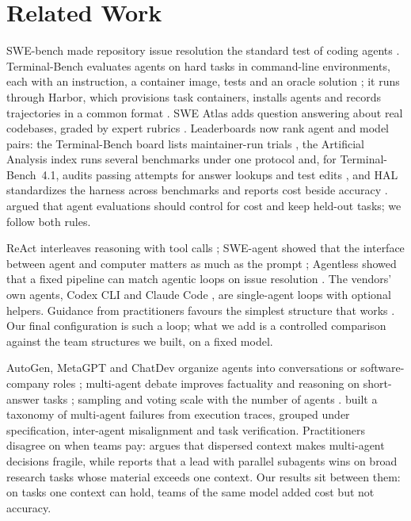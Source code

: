 \section{Related Work}
\label{sec:related}

 SWE-bench made repository issue resolution the
standard test of coding agents \citep{jimenez2024swebench}. Terminal-Bench evaluates agents on hard
tasks in command-line environments, each with an instruction, a container image, tests and an
oracle solution \citep{merrill2026terminalbench}; it runs through Harbor, which provisions task
containers, installs agents and records trajectories in a common format \citep{harbor2026}. SWE
Atlas adds question answering about real codebases, graded by expert rubrics
\citep{raghavendra2026sweatlas}. Leaderboards now rank agent and model pairs: the Terminal-Bench
board lists maintainer-run trials \citep{tbench2026board}, the Artificial Analysis index runs
several benchmarks under one protocol and, for Terminal-Bench~4.1, audits passing attempts for
answer lookups and test edits \citep{aa2026coding}, and HAL standardizes the harness across
benchmarks and reports cost beside accuracy \citep{kapoor2026hal}. \citet{kapoor2024agents} argued
that agent evaluations should control for cost and keep held-out tasks; we follow both rules.

 ReAct interleaves reasoning with tool calls \citep{yao2023react}; SWE-agent
showed that the interface between agent and computer matters as much as the prompt
\citep{yang2024sweagent}; Agentless showed that a fixed pipeline can match agentic loops on
issue resolution \citep{xia2024agentless}. The vendors' own agents, Codex CLI
\citep{openai2025codex} and Claude Code \citep{anthropic2025claudecode}, are single-agent loops
with optional helpers. Guidance from practitioners favours the simplest structure that works
\citep{schluntz2024effective}. Our final configuration is such a loop; what we add is a controlled
comparison against the team structures we built, on a fixed model.

 AutoGen, MetaGPT and ChatDev organize agents into conversations or
software-company roles \citep{wu2024autogen,hong2024metagpt,qian2024chatdev}; multi-agent debate
improves factuality and reasoning on short-answer tasks \citep{du2024debate}; sampling and voting
scale with the number of agents \citep{li2024moreagents}. \citet{cemri2025mast} built a taxonomy of
multi-agent failures from execution traces, grouped under specification, inter-agent misalignment
and task verification. Practitioners disagree on when teams pay: \citet{yan2025dontbuild} argues
that dispersed context makes multi-agent decisions fragile, while \citet{anthropic2025multiagent}
reports that a lead with parallel subagents wins on broad research tasks whose material exceeds
one context. Our results sit between them: on tasks one context can hold, teams of the same model
added cost but not accuracy.

